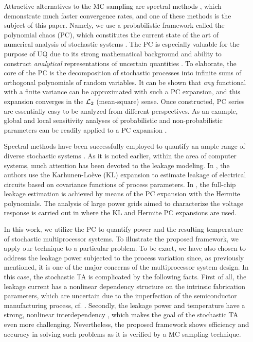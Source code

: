 Attractive alternatives to the MC sampling are spectral methods \cite{maitre2010}, which demonstrate much faster convergence rates, and one of these methods is the subject of this paper. Namely, we use a probabilistic framework called the polynomial chaos (PC), which constitutes the current state of the art of numerical analysis of stochastic systems \cite{xiu2009}. The PC is especially valuable for the purpose of UQ due to its strong mathematical background and ability to construct \emph{analytical} representations of uncertain quantities \cite{eldred2009}. To elaborate, the core of the PC is the decomposition of stochastic processes into infinite sums of orthogonal polynomials of random variables. It can be shown that \emph{any} functional with a finite variance can be approximated with such a PC expansion, and this expansion converges in the $\mathcal{L}_{2}$ (mean-square) sense. Once constructed, PC series are essentially easy to be analyzed from different perspectives. As an example, global and local sensitivity analyses of probabilistic and non-probabilistic parameters can be readily applied to a PC expansion \cite{eldred2009, maitre2010}.

Spectral methods have been successfully employed to quantify an ample range of diverse stochastic systems \cite{xiu2010}. As it is noted earlier, within the area of computer systems, much attention has been devoted to the leakage modeling. In \cite{bhardwaj2006}, the authors use the Karhunen-Lo\`{e}ve (KL) expansion \cite{loeve1978} to estimate leakage of electrical circuits based on covariance functions of process parameters. In \cite{shen2009}, the full-chip leakage estimation is achieved by means of the PC expansion with the Hermite polynomials. The analysis of large power grids aimed to characterize the voltage response is carried out in \cite{ghanta2006} where the KL and Hermite PC expansions are used.

In this work, we utilize the PC to quantify power and the resulting temperature of stochastic multiprocessor systems. To illustrate the proposed framework, we apply our technique to a particular problem. To be exact, we have also chosen to address the leakage power subjected to the process variation since, as previously mentioned, it is one of the major concerns of the multiprocessor system design. In this case, the stochastic TA is complicated by the following facts. First of all, the leakage current has a nonlinear dependency structure on the intrinsic fabrication parameters, which are uncertain due to the imperfection of the semiconductor manufacturing process, cf. \cite{juan2011, juan2012, srivastava2010}. Secondly, the leakage power and temperature have a strong, nonlinear interdependency \cite{liu2007}, which makes the goal of the stochastic TA even more challenging. Nevertheless, the proposed framework shows efficiency and accuracy in solving such problems as it is verified by a MC sampling technique.

